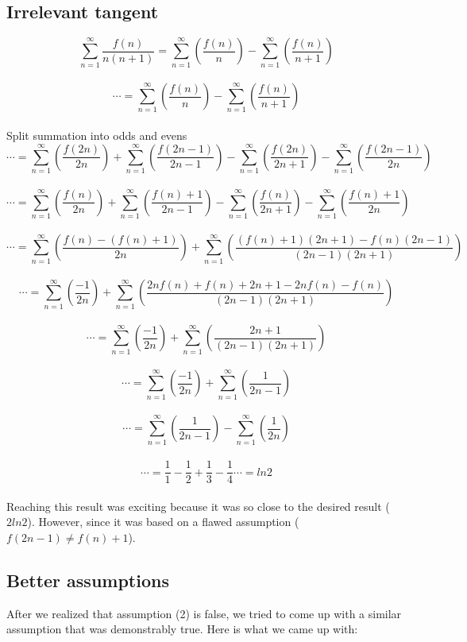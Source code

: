 \documentclass{article}
\begin{document}
\subsection{Irrelevant tangent}
$$\sum_{n=1}^\infty \frac{f(n)}{n(n+1)} =\sum_{n=1}^\infty \left( \frac{f(n)}{n} \right)-\sum_{n=1}^\infty \left( \frac{f(n)}{n+1} \right)$$\\
$$\cdots =\sum_{n=1}^\infty \left( \frac{f(n)}{n} \right)-\sum_{n=1}^\infty \left( \frac{f(n)}{n+1} \right)$$\\
Split summation into odds and evens
$$\cdots =\sum_{n=1}^\infty \left( \frac{f(2n)}{2n} \right)+\sum_{n=1}^\infty \left( \frac{f(2n-1)}{2n-1} \right)
-\sum_{n=1}^\infty \left( \frac{f(2n)}{2n+1} \right)-\sum_{n=1}^\infty \left( \frac{f(2n-1)}{2n} \right)$$\\
$$\cdots =\sum_{n=1}^\infty \left( \frac{f(n)}{2n} \right)+\sum_{n=1}^\infty \left( \frac{f(n)+1}{2n-1} \right)
-\sum_{n=1}^\infty \left( \frac{f(n)}{2n+1} \right)-\sum_{n=1}^\infty \left( \frac{f(n)+1}{2n} \right)$$\\
$$\cdots =\sum_{n=1}^\infty \left( \frac{f(n)-(f(n)+1)}{2n} \right)
+\sum_{n=1}^\infty \left( \frac{(f(n)+1)(2n+1)-f(n)(2n-1)}{(2n-1)(2n+1)} \right)$$\\
$$\cdots =\sum_{n=1}^\infty \left( \frac{-1}{2n} \right)
+\sum_{n=1}^\infty \left( \frac{2nf(n)+f(n)+2n+1-2nf(n)-f(n)}{(2n-1)(2n+1)} \right)$$\\
$$\cdots =\sum_{n=1}^\infty \left( \frac{-1}{2n} \right)
+\sum_{n=1}^\infty \left( \frac{2n+1}{(2n-1)(2n+1)} \right)$$\\
$$\cdots =\sum_{n=1}^\infty \left( \frac{-1}{2n} \right)
+\sum_{n=1}^\infty \left( \frac{1}{2n-1} \right)$$\\
$$\cdots =\sum_{n=1}^\infty \left( \frac{1}{2n-1} \right)
-\sum_{n=1}^\infty \left( \frac{1}{2n} \right)$$\\
$$\cdots =\frac{1}{1} - \frac{1}{2} + \frac{1}{3} - \frac{1}{4} \cdots = ln2$$\\
Reaching this result was exciting because it was so close to the desired result ($2ln2$). However, since it was based on a flawed assumption ($f(2n-1) \neq f(n) + 1$).

\subsection{Better assumptions}
After we realized that assumption (2) is false, we tried to come up with a similar assumption that was demonstrably true. Here is what we came up with:\\
\end{document}
